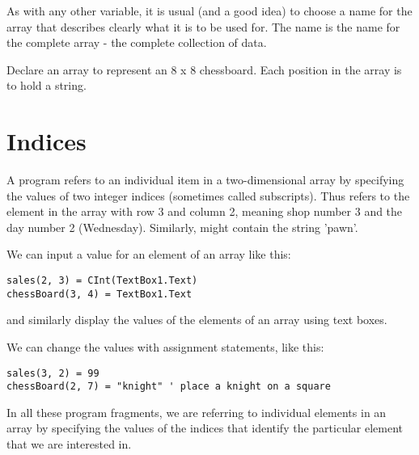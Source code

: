 		As with any other variable, it is usual (and a good idea) to choose a name for the array that describes clearly what it is to be used for. The name is the name for the complete array - the complete collection of data.

		\begin{stqb}
			\begin{STQ}
			\item Declare an array to represent an 8 x 8 chessboard. Each position in the array is to hold a string.
			\end{STQ}
		\end{stqb}


	\section{Indices}
		A program refers to an individual item in a two-dimensional array by specifying the values of two integer indices (sometimes called subscripts). Thus  refers to the element in the array with row 3 and column 2, meaning shop number 3 and the day number 2 (Wednesday). Similarly,  might contain the string 'pawn'.
		
		We can input a value for an element of an array like this:
		\begin{lstlisting}
sales(2, 3) = CInt(TextBox1.Text)
chessBoard(3, 4) = TextBox1.Text
		\end{lstlisting}
		and similarly display the values of the elements of an array using text boxes.
		
		We can change the values with assignment statements, like this:
		\begin{lstlisting}
sales(3, 2) = 99
chessBoard(2, 7) = "knight" ' place a knight on a square
		\end{lstlisting}
		In all these program fragments, we are referring to individual elements in an array by specifying the values of the indices that identify the particular element that we are interested in.
		
